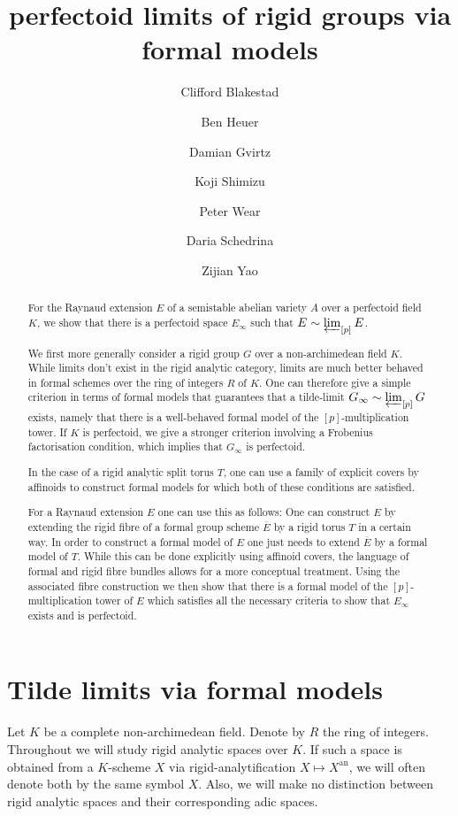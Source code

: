 \documentclass[11pt,oneside]{amsart}
\title[perfectoid limits of rigid groups via formal models]{perfectoid limits of rigid groups via formal models}
\author{
	Clifford Blakestad \and
	Ben Heuer \and 
	Damian Gvirtz \and
	Koji Shimizu \and 
	Peter Wear \and
	Daria Schedrina \and
	Zijian Yao}
\theoremstyle{definition}
\theoremstyle{remark}
\begin{document}
	
	\maketitle
	
	\begin{abstract}
		For the Raynaud extension $E$ of a semistable abelian variety $A$ over a perfectoid field $K$, we show that there is a perfectoid space $E_\infty$ such that $E\sim\varprojlim_{[p]}E$. 
		
		We first more generally consider a rigid group  $G$ over a non-archimedean field $K$. While limits don't exist in the rigid analytic category, limits are much better behaved in formal schemes over the ring of integers $R$ of $K$. One can therefore give a simple criterion in terms of formal models that guarantees that a tilde-limit $G_\infty \sim\varprojlim_{[p]} G$ exists, namely that there is a well-behaved formal model of the $[p]$-multiplication tower.
		If $K$ is perfectoid, we give a stronger criterion involving a Frobenius factorisation condition, which implies that $G_\infty$ is perfectoid.
		
		In the case of a rigid analytic split torus $T$, one can use a family of explicit covers by affinoids to construct formal models for which both of these conditions are satisfied. 
		
		For a Raynaud extension $E$ one can use this as follows: One can construct $E$ by extending the rigid fibre of a formal group scheme $\overline{E}$ by a rigid torus $T$ in a certain way. In order to construct a formal model of $E$ one just needs to extend $\overline{E}$ by a formal model of $T$. While this can be done explicitly using affinoid covers, the language of formal and rigid fibre bundles allows for a more conceptual treatment. Using the associated fibre construction we then show that there is a formal model of the $[p]$-multiplication tower of $E$ which satisfies all the necessary criteria to show that $E_\infty$ exists and is perfectoid.  
	
	\end{abstract}
	\tableofcontents

	\section{Tilde limits via formal models}
	Let $K$ be a complete non-archimedean field. Denote by $R$ the ring of integers. Throughout we will study rigid analytic spaces over $K$. If such a space is obtained from a $K$-scheme $X$ via rigid-analytification $X\mapsto X^{\operatorname{an}}$, we will often denote both by the same symbol $X$. Also, we will make no distinction between rigid analytic spaces and their corresponding adic spaces.
\end{document}
